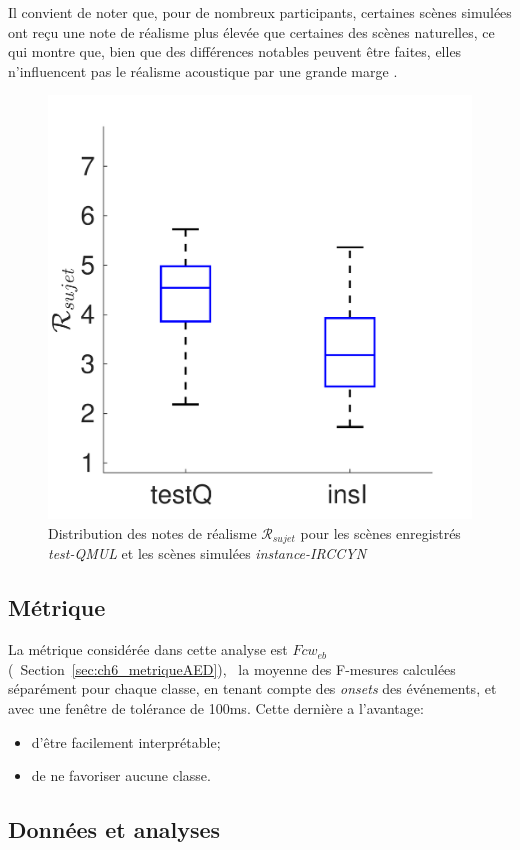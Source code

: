 Il convient de noter que, pour de nombreux participants, certaines scènes simulées ont reçu une note de réalisme plus élevée que certaines des scènes naturelles, ce qui montre que, bien que des différences notables peuvent être faites, elles n'influencent pas le réalisme acoustique par une grande marge .

\begin{figure}[t]
\begin{center}
\includegraphics[width=.33\textwidth]{gfx/ch_7/xp_realism_2}
\caption{Distribution des notes de réalisme $\mathcal{R}_{sujet}$ pour les scènes enregistrés \emph{test-QMUL} et les scènes simulées \emph{instance-IRCCYN}}
\label{fig:xpRealism} 
\end{center}
\end{figure}

\subsection{Métrique}

La métrique considérée dans cette analyse est $Fcw_{eb}$ (\cf~Section~\ref{sec:ch6_metriqueAED}), \ie~la moyenne des F-mesures calculées séparément pour chaque classe, en tenant compte des \emph{onsets} des événements, et avec une fenêtre de tolérance de 100ms. Cette dernière a l'avantage: 

\begin{itemize}
\item d'être facilement interprétable;
\item de ne favoriser aucune classe.
\end{itemize}

\subsection{Données et analyses}


